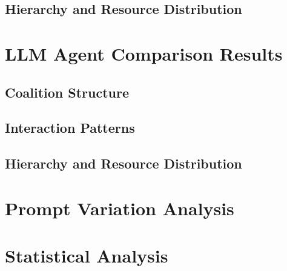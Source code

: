 \subsection{Hierarchy and Resource Distribution}

\section{LLM Agent Comparison Results}

\subsection{Coalition Structure}

\subsection{Interaction Patterns}

\subsection{Hierarchy and Resource Distribution}

\section{Prompt Variation Analysis}

\section{Statistical Analysis}

